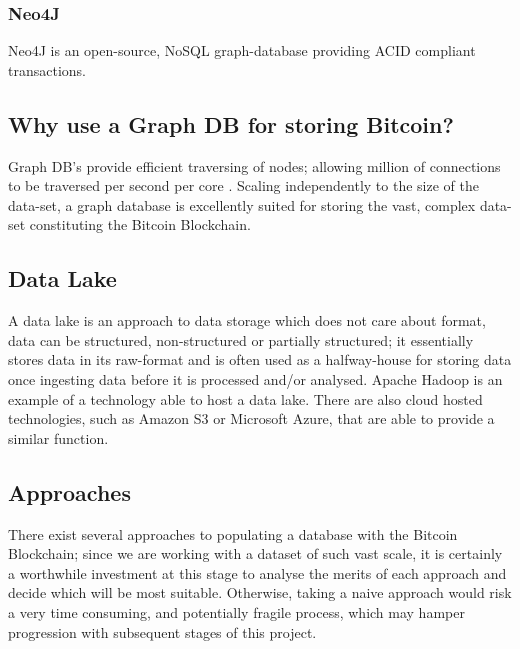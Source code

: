 \subsubsection{Neo4J}
Neo4J is an open-source, NoSQL graph-database providing ACID compliant transactions.

\subsection{Why use a Graph DB for storing Bitcoin?}
Graph DB's provide efficient traversing of nodes; allowing million of connections to be traversed per second per core \cite{RefWorks:doc:5c98f0c6e4b00cbb4da393d8}. Scaling independently to the size of the data-set, a graph database is excellently suited for storing the vast, complex data-set constituting the Bitcoin Blockchain. 





\subsection{Data Lake}
A data lake is an approach to data storage which does not care about format, data can be structured, non-structured or partially structured; it essentially stores data in its raw-format and is often used as a halfway-house for storing data once ingesting data before it is processed and/or analysed. Apache Hadoop is an example of a technology able to host a data lake. There are also cloud hosted technologies, such as Amazon S3 or Microsoft Azure, that are able to provide a similar function. 

\subsection{Approaches}
There exist several approaches to populating a database with the Bitcoin Blockchain; since we are working with a dataset of such vast scale, it is certainly a worthwhile investment at this stage to analyse the merits of each approach and decide which will be most suitable. Otherwise, taking a naive approach would risk a very time consuming, and potentially fragile process, which may hamper progression with subsequent stages of this project. 



